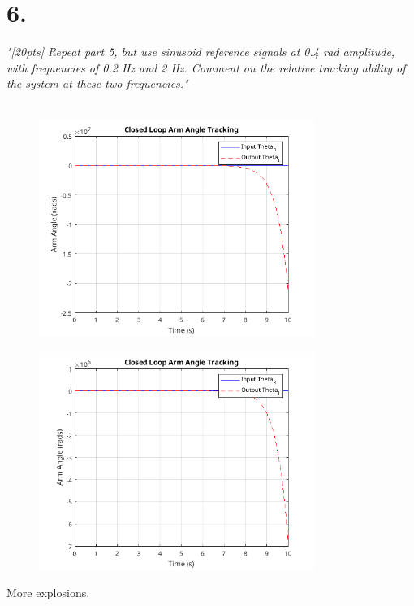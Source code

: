 \documentclass{article}
\begin{document}
\section*{6.}

\textit{
    "[20pts] Repeat part 5, but use sinusoid reference signals at 0.4 rad amplitude, with frequencies
    of 0.2 Hz and 2 Hz. Comment on the relative tracking ability of the system at these two
    frequencies."
}
\\
\\
\begin{figure}[H]
    \centering
    \includegraphics[width=0.8\textwidth]{closedSinePoint2Hz.png}
\end{figure}

\begin{figure}[H]
    \centering
    \includegraphics[width=0.8\textwidth]{closedSine2Hz.png}
\end{figure}

More explosions.
\end{document}
